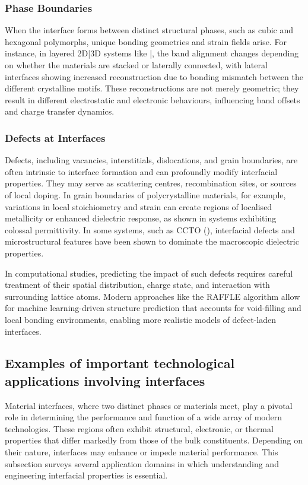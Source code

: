 \subsubsection{Phase Boundaries}

When the interface forms between distinct structural phases, such as cubic and hexagonal polymorphs, unique bonding
geometries and strain fields arise. For instance, in layered 2D|3D systems like |, the band
alignment changes depending on whether the materials are stacked or laterally connected, with lateral interfaces
showing increased reconstruction due to bonding mismatch between the different crystalline motifs. These
reconstructions are not merely geometric; they result in different electrostatic and electronic behaviours,
influencing band offsets and charge transfer dynamics.

\subsubsection{Defects at Interfaces}

Defects, including vacancies, interstitials, dislocations, and grain boundaries, are often intrinsic to interface
formation and can profoundly modify interfacial properties. They may serve as scattering centres, recombination
sites, or sources of local doping. In grain boundaries of polycrystalline materials, for example, variations in
local stoichiometry and strain can create regions of localised metallicity or enhanced dielectric response, as shown
in systems exhibiting colossal permittivity. In some systems, such as CCTO (), interfacial defects
and microstructural features have been shown to dominate the macroscopic dielectric properties.

In computational studies, predicting the impact of such defects requires careful treatment of their spatial
distribution, charge state, and interaction with surrounding lattice atoms. Modern approaches like the RAFFLE
algorithm allow for machine learning-driven structure prediction that accounts for void-filling and local bonding
environments, enabling more realistic models of defect-laden interfaces.

\subsection{Examples of important technological applications involving interfaces}

Material interfaces, where two distinct phases or materials meet, play a pivotal role in determining the performance
and function of a wide array of modern technologies. These regions often exhibit structural, electronic, or thermal
properties that differ markedly from those of the bulk constituents. Depending on their nature, interfaces may
enhance or impede material performance. This subsection surveys several application domains in which understanding
and engineering interfacial properties is essential.

